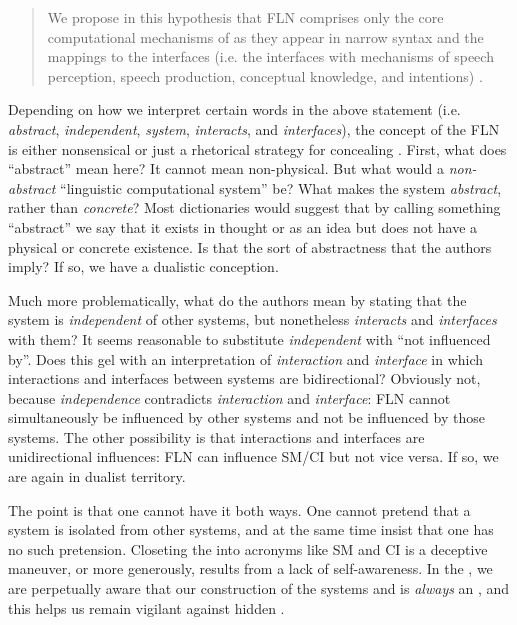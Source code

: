 \begin{quote}
We propose in this hypothesis that FLN comprises only the core computational mechanisms of  as they appear in narrow  syntax and the mappings to the interfaces (i.e. the interfaces with mechanisms of speech perception, speech production, conceptual  knowledge, and intentions) \citep{HauserEtAl2002}.
\end{quote}

  Depending on how we interpret certain words in the above statement (i.e. \textit{abstract}, \textit{independent}, \textit{system}, \textit{interacts}, and \textit{interfaces}), the concept of the FLN is either nonsensical or just a rhetorical strategy for concealing . First, what does “abstract” mean here? It cannot mean non-physical. But what would a \textit{non-abstract} “linguistic computational system” be? What makes the system \textit{abstract}, rather than \textit{concrete}? Most dictionaries would suggest that by calling something “abstract” we say that it exists in thought or as an idea but does not have a physical or concrete existence. Is that the sort of abstractness that the authors imply? If so, we have a dualistic conception. 

  Much more problematically, what do the authors mean by stating that the system is \textit{independent} of other systems, but nonetheless \textit{interacts} and \textit{interfaces} with them? It seems reasonable to substitute \textit{independent} with “not influenced by”. Does this gel with an interpretation of \textit{interaction} and \textit{interface} in which interactions and interfaces between systems are bidirectional? Obviously not, because \textit{independence} contradicts \textit{interaction} and \textit{interface}: FLN cannot simultaneously be influenced by other systems and not be influenced by those systems. The other possibility is that interactions and interfaces are unidirectional influences: FLN can influence SM/CI but not vice versa. If so, we are again in dualist territory. 

  The point is that one cannot have it both ways. One cannot pretend that a system is isolated from other systems, and at the same time insist that one has no such pretension. Closeting the  into acronyms like SM and CI is a deceptive maneuver, or more generously, results from a lack of self-awareness. In the , we are perpetually aware that our construction of the systems and  is \textit{always} an , and this helps us remain vigilant against hidden .

